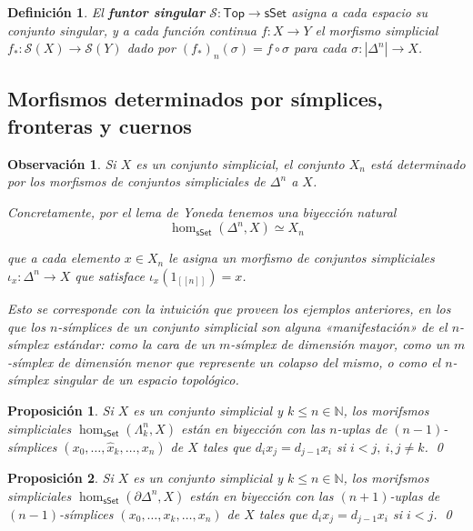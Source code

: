 \documentclass[11pt]{report}
\theoremstyle{colored}
\newtheorem{definition}{Definición}[section]
\newtheorem{proposition}{Proposición}[section]
\newtheorem{remark}{Observación}[section]
\newcommand{\N}{\mathbb{N}}
\newcommand{\nat}[1]{[\![#1]\!]}
\newcommand{\ord}[1]{\nat{#1}}
\newcommand{\cat}[1]{\mathsf{#1}}
\renewcommand{\ss}[1]{\Delta^{#1}}
\newcommand{\horn}[2]{\Lambda^{#1}_{#2}}
\begin{document}
\begin{definition} El \textbf{funtor singular} $\mathcal{S} : \cat{Top} \to \cat{sSet}$ asigna a cada espacio su conjunto singular, y a cada función continua $f : X \to Y$ el morfismo simplicial $f_* : \mathcal{S}(X) \to \mathcal{S}(Y)$ dado por $(f_*)_n(\sigma) =  f \circ \sigma$ para cada $\sigma: |\ss{n}| \to X$.
\end{definition}

\subsection{Morfismos determinados por símplices, fronteras y cuernos}

\begin{remark} Si $X$ es un conjunto simplicial, el conjunto $X_n$ está determinado por los morfismos de conjuntos simpliciales de $\ss{n}$ a $X$. 

Concretamente, por el lema de Yoneda tenemos una biyección natural
\[
\hom_{\cat{sSet}}(\ss{n},X) \simeq X_n
\]

que a cada elemento $x \in X_n$ le asigna un morfismo de conjuntos simpliciales $\iota_x : \ss{n} \to X$ que satisface $\iota_x(1_{\ord{n}}) = x$. 

Esto se corresponde con la intuición que proveen los ejemplos anteriores, en los que los $n$-símplices de un conjunto simplicial son alguna «manifestación» de el $n$-símplex estándar: como la cara de un $m$-símplex de dimensión mayor, como un $m$-símplex de dimensión menor que represente un colapso del mismo, o como el $n$-símplex singular de un espacio topológico.\\
\end{remark}

\begin{proposition} Si $X$ es un conjunto simplicial y $k \leq n \in \N$, los morifsmos simpliciales $\hom_{\cat{sSet}}(\horn{n}{k}, X)$ están en biyección con las $n$-uplas de $(n-1)$-símplices $(x_0,\dots,\widehat{x}_k,\dots, x_n)$ de $X$ tales que $d_ix_j = d_{j-1}x_i$ si $i < j, \ i,j \neq k$. \qed
\end{proposition}

\begin{proposition} Si $X$ es un conjunto simplicial y $k \leq n \in \N$, los morifsmos simpliciales $\hom_{\cat{sSet}}(\partial\ss{n}, X)$ están en biyección con las $(n+1)$-uplas de $(n-1)$-símplices $(x_0,\dots,x_k,\dots, x_n)$ de $X$ tales que $d_ix_j = d_{j-1}x_i$ si $i < j$. \qed
\end{proposition}
\end{document}
